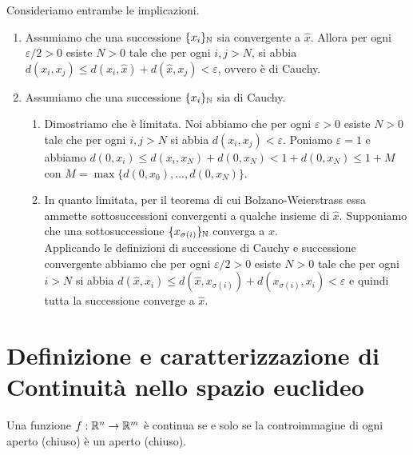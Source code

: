 \documentclass[openany]{book}
\begin{document}
    Consideriamo entrambe le implicazioni.\begin{enumerate}
        \item Assumiamo che una successione $\{x_i\}_{\mathbb{N}}$ sia convergente a $\hat{x}$. Allora per ogni $\varepsilon/2>0$ esiste $N>0$ tale che per ogni $i,j>N$, si abbia $d(x_i,x_j) \le d(x_i, \hat{x}) + d(\hat{x},x_j) < \varepsilon$, ovvero è di Cauchy.
        \item Assumiamo che una successione $\{x_i\}_{\mathbb{N}}$ sia di Cauchy. \begin{enumerate}
            \item Dimostriamo che è limitata. Noi abbiamo che per ogni $\varepsilon >0$ esiste $N>0$ tale che per ogni $i,j >N$ si abbia $d(x_i, x_j) < \varepsilon$. Poniamo $\varepsilon = 1$ e abbiamo $d(0, x_i) \le d(x_i, x_N) + d(0, x_N) < 1 + d(0, x_N) \le 1 + M$ con  $M = \max \{d(0,x_0), ..., d(0, x_N)\}$.
            \item In quanto limitata, per il teorema di cui Bolzano-Weierstrass essa ammette sottosuccessioni convergenti a qualche insieme di $\hat{x}$. Supponiamo che una sottosuccessione $\{x_{\sigma(i)}\}_{\mathbb{N}}$ converga a $\hat{x}$.\\
            Applicando le definizioni di successione di Cauchy e successione convergente abbiamo che per ogni $\varepsilon/2 > 0$ esiste $N>0$ tale che per ogni $i>N$ si abbia $d(\hat{x},x_i) \le d(\hat{x}, x_{\sigma(i)}) + d(x_{\sigma(i)}, x_i) < \varepsilon$ e quindi tutta la successione converge a $\hat{x}$.
        \end{enumerate}
    \end{enumerate}


\section{Definizione e caratterizzazione di Continuità nello spazio euclideo}

\begin{theorem}{}{}
    Una funzione $f:\mathbb{R}^n \to \mathbb{R}^m$ è continua se e solo se la controimmagine di ogni aperto (chiuso) è un aperto (chiuso).
\end{theorem}
\end{document}
